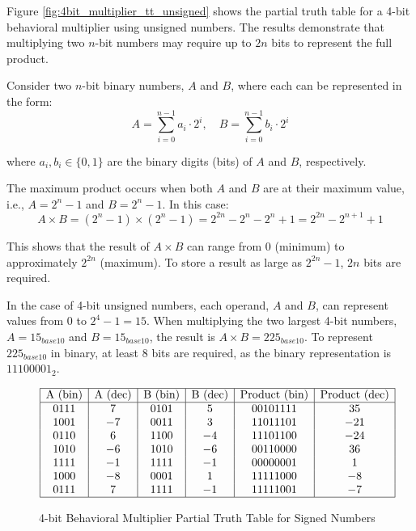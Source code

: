 Figure \ref{fig:4bit_multiplier_tt_unsigned} shows the partial truth table for a 4-bit behavioral multiplier using unsigned numbers. The results demonstrate that multiplying two $n$-bit numbers may require up to $2n$ bits to represent the full product.

Consider two $n$-bit binary numbers, $A$ and $B$, where each can be represented in the form:
\[
A = \sum_{i=0}^{n-1} a_i \cdot 2^i, \quad B = \sum_{i=0}^{n-1} b_i \cdot 2^i
\]

where $a_i, b_i \in \{0, 1\}$ are the binary digits (bits) of $A$ and $B$, respectively.

The maximum product occurs when both $A$ and $B$ are at their maximum value, i.e., $A = 2^n - 1$ and $B = 2^n - 1$. In this case:
\[
A \times B = (2^n - 1) \times (2^n - 1) = 2^{2n} - 2^n - 2^n + 1 = 2^{2n} - 2^{n+1} + 1
\]

This shows that the result of $A \times B$ can range from $0$ (minimum) to approximately $2^{2n}$ (maximum). To store a result as large as $2^{2n} - 1$, $2n$ bits are required.

In the case of 4-bit unsigned numbers, each operand, $A$ and $B$, can represent values from $0$ to $2^4 - 1 = 15$. When multiplying the two largest 4-bit numbers, $A = 15_{base10}$ and $B = 15_{base10}$, the result is $A \times B = 225_{base10}$. To represent $225_{base10}$ in binary, at least 8 bits are required, as the binary representation is $11100001_2$.

\begin{figure}[H]
    \centering
\[
\begin{array}{|c|c|c|c|c|c|}
\hline
\text{A (bin)} & \text{A (dec)} & \text{B (bin)} & \text{B (dec)} & \text{Product (bin)} & \text{Product (dec)} \\
\hline
0111 & 7 & 0101 & 5 & 00101111 & 35 \\
1001 & -7 & 0011 & 3 & 11011101 & -21 \\
0110 & 6 & 1100 & -4 & 11101100 & -24 \\
1010 & -6 & 1010 & -6 & 00110000 & 36 \\
1111 & -1 & 1111 & -1 & 00000001 & 1 \\
1000 & -8 & 0001 & 1 & 11111000 & -8 \\
0111 & 7 & 1111 & -1 & 11111001 & -7 \\
\hline
\end{array}
\]
    \caption{4-bit Behavioral Multiplier Partial Truth Table for Signed Numbers}
    \label{fig:4bit_multiplier_tt_signed}
\end{figure}

